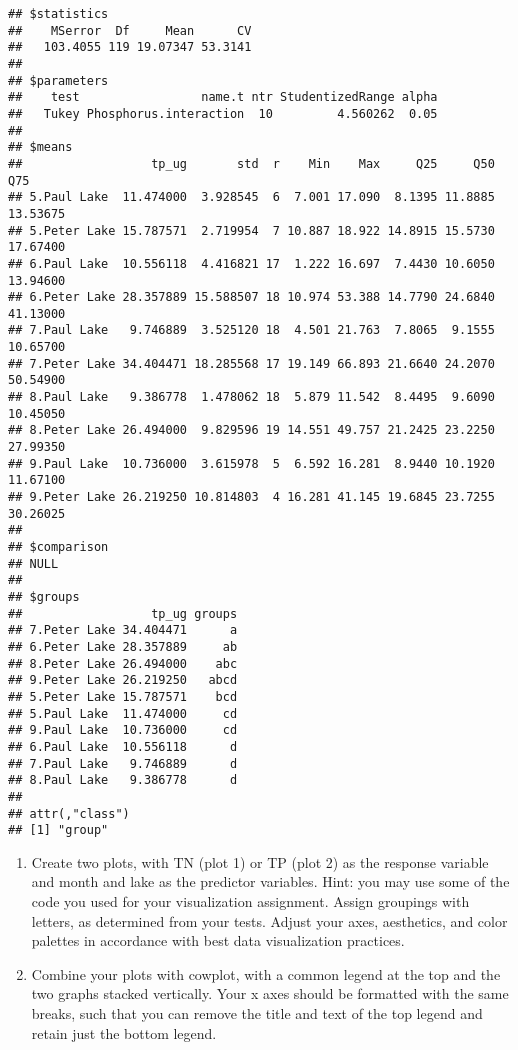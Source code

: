 \documentclass[]{article}
\begin{document}
\begin{verbatim}
## $statistics
##    MSerror  Df     Mean      CV
##   103.4055 119 19.07347 53.3141
## 
## $parameters
##    test                 name.t ntr StudentizedRange alpha
##   Tukey Phosphorus.interaction  10         4.560262  0.05
## 
## $means
##                  tp_ug       std  r    Min    Max     Q25     Q50      Q75
## 5.Paul Lake  11.474000  3.928545  6  7.001 17.090  8.1395 11.8885 13.53675
## 5.Peter Lake 15.787571  2.719954  7 10.887 18.922 14.8915 15.5730 17.67400
## 6.Paul Lake  10.556118  4.416821 17  1.222 16.697  7.4430 10.6050 13.94600
## 6.Peter Lake 28.357889 15.588507 18 10.974 53.388 14.7790 24.6840 41.13000
## 7.Paul Lake   9.746889  3.525120 18  4.501 21.763  7.8065  9.1555 10.65700
## 7.Peter Lake 34.404471 18.285568 17 19.149 66.893 21.6640 24.2070 50.54900
## 8.Paul Lake   9.386778  1.478062 18  5.879 11.542  8.4495  9.6090 10.45050
## 8.Peter Lake 26.494000  9.829596 19 14.551 49.757 21.2425 23.2250 27.99350
## 9.Paul Lake  10.736000  3.615978  5  6.592 16.281  8.9440 10.1920 11.67100
## 9.Peter Lake 26.219250 10.814803  4 16.281 41.145 19.6845 23.7255 30.26025
## 
## $comparison
## NULL
## 
## $groups
##                  tp_ug groups
## 7.Peter Lake 34.404471      a
## 6.Peter Lake 28.357889     ab
## 8.Peter Lake 26.494000    abc
## 9.Peter Lake 26.219250   abcd
## 5.Peter Lake 15.787571    bcd
## 5.Paul Lake  11.474000     cd
## 9.Paul Lake  10.736000     cd
## 6.Paul Lake  10.556118      d
## 7.Paul Lake   9.746889      d
## 8.Paul Lake   9.386778      d
## 
## attr(,"class")
## [1] "group"
\end{verbatim}

\begin{enumerate}
\def\labelenumi{\arabic{enumi}.}
\setcounter{enumi}{6}
\item
  Create two plots, with TN (plot 1) or TP (plot 2) as the response
  variable and month and lake as the predictor variables. Hint: you may
  use some of the code you used for your visualization assignment.
  Assign groupings with letters, as determined from your tests. Adjust
  your axes, aesthetics, and color palettes in accordance with best data
  visualization practices.
\item
  Combine your plots with cowplot, with a common legend at the top and
  the two graphs stacked vertically. Your x axes should be formatted
  with the same breaks, such that you can remove the title and text of
  the top legend and retain just the bottom legend.
\end{enumerate}
\end{document}
